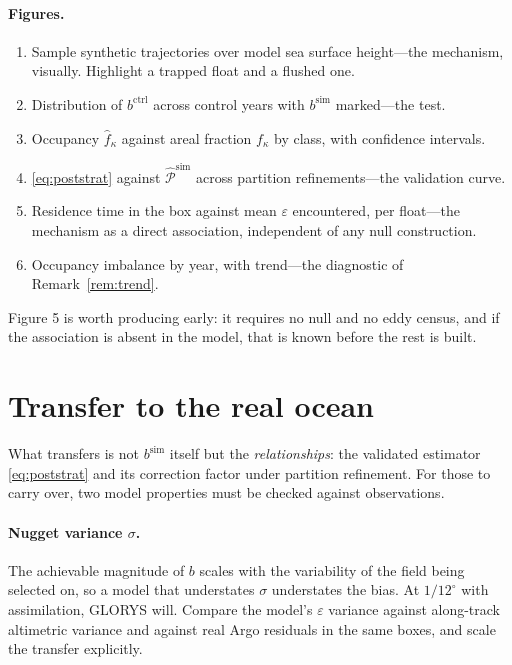 \documentclass[11pt]{article}
\begin{document}
\paragraph{Figures.}
\begin{enumerate}[leftmargin=*]
  \item Sample synthetic trajectories over model sea surface height---the mechanism, visually.
        Highlight a trapped float and a flushed one.
  \item Distribution of $b^{\text{ctrl}}$ across control years with $b^{\text{sim}}$ marked---the
        test.
  \item Occupancy $\hat{f}_\kappa$ against areal fraction $f_\kappa$ by class, with confidence
        intervals.
  \item \eqref{eq:poststrat} against $\widehat{\mathcal{P}}^{\text{sim}}$ across partition
        refinements---the validation curve.
  \item Residence time in the box against mean $\varepsilon$ encountered, per float---the
        mechanism as a direct association, independent of any null construction.
  \item Occupancy imbalance by year, with trend---the diagnostic of Remark~\ref{rem:trend}.
\end{enumerate}

Figure 5 is worth producing early: it requires no null and no eddy census, and if the
association is absent in the model, that is known before the rest is built.

\section{Transfer to the real ocean}
\label{sec:transfer}

What transfers is not $b^{\text{sim}}$ itself but the \emph{relationships}: the validated
estimator \eqref{eq:poststrat} and its correction factor under partition refinement. For those
to carry over, two model properties must be checked against observations.

\paragraph{Nugget variance $\sigma$.} The achievable magnitude of $b$ scales with the
variability of the field being selected on, so a model that understates $\sigma$ understates the
bias. At $1/12^\circ$ with assimilation, GLORYS will. Compare the model's $\varepsilon$ variance
against along-track altimetric variance and against real Argo residuals in the same boxes, and
scale the transfer explicitly.
\end{document}
